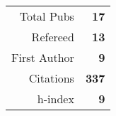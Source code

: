 \begin{table}\begin{tabular}{rr}Total Pubs & \textbf{17}\\Refereed & \textbf{13}\\First Author & \textbf{9}\\Citations & \quad \textbf{337}\\h-index & \textbf{9}\end{tabular}\end{table}